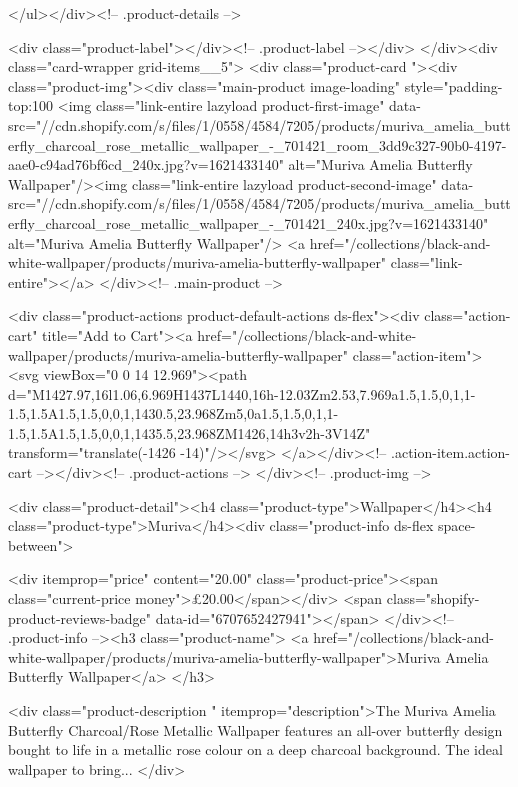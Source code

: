 {{{{{{{      </ul></div><!-- .product-details -->

<div class="product-label"></div><!-- .product-label --></div>
          </div><div class="card-wrapper grid-items__5">
            <div class="product-card "><div class="product-img"><div class="main-product image-loading" style="padding-top:100%
      <img class="link-entire lazyload product-first-image" data-src="//cdn.shopify.com/s/files/1/0558/4584/7205/products/muriva_amelia_butterfly_charcoal_rose_metallic_wallpaper_-_701421_room_3dd9c327-90b0-4197-aae0-c94ad76bf6cd_240x.jpg?v=1621433140" alt="Muriva Amelia Butterfly Wallpaper"/><img class="link-entire lazyload product-second-image" data-src="//cdn.shopify.com/s/files/1/0558/4584/7205/products/muriva_amelia_butterfly_charcoal_rose_metallic_wallpaper_-_701421_240x.jpg?v=1621433140" alt="Muriva Amelia Butterfly Wallpaper"/>
      <a href="/collections/black-and-white-wallpaper/products/muriva-amelia-butterfly-wallpaper" class="link-entire"></a>
    </div><!-- .main-product -->
  
<div class="product-actions product-default-actions ds-flex"><div class="action-cart" title="Add to Cart"><a href="/collections/black-and-white-wallpaper/products/muriva-amelia-butterfly-wallpaper" class="action-item"><svg viewBox="0 0 14 12.969"><path d="M1427.97,16l1.06,6.969H1437L1440,16h-12.03Zm2.53,7.969a1.5,1.5,0,1,1-1.5,1.5A1.5,1.5,0,0,1,1430.5,23.968Zm5,0a1.5,1.5,0,1,1-1.5,1.5A1.5,1.5,0,0,1,1435.5,23.968ZM1426,14h3v2h-3V14Z" transform="translate(-1426 -14)"/></svg>
</a></div><!-- .action-item.action-cart --></div><!-- .product-actions -->
</div><!-- .product-img -->

<div class="product-detail"><h4 class="product-type">Wallpaper</h4><h4 class="product-type">Muriva</h4><div class="product-info ds-flex space-between">
    
<div itemprop="price" content="20.00" class="product-price"><span class="current-price money">£20.00</span></div>
    <span class="shopify-product-reviews-badge" data-id="6707652427941"></span>
  </div><!-- .product-info --><h3 class="product-name">
      <a href="/collections/black-and-white-wallpaper/products/muriva-amelia-butterfly-wallpaper">Muriva Amelia Butterfly Wallpaper</a>
    </h3>
    
<div class="product-description " itemprop="description">The Muriva Amelia Butterfly Charcoal/Rose Metallic Wallpaper features an all-over butterfly design bought to life in a metallic rose colour on a deep charcoal background. The ideal wallpaper to bring...
</div>



}}}}}}}
